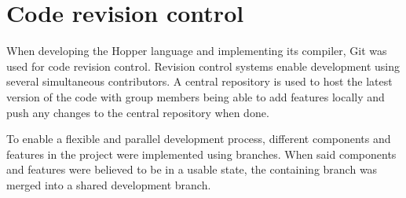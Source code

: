 \section{Code revision control}

When developing the Hopper language and implementing its compiler, Git\cite{git} was used for code revision control. Revision control systems enable development using several simultaneous contributors. A central repository is used to host the latest version of the code with group members being able to add features locally and push any changes to the central repository when done.

To enable a flexible and parallel development process, different components and features in the project were implemented using branches. When said components and features were believed to be in a usable state, the containing branch was merged into a shared development branch.
